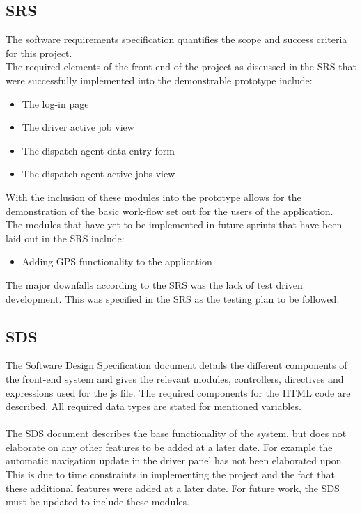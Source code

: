 \documentclass[12pt]{article}
\begin{document}
\subsection{SRS}
The software requirements specification quantifies the scope and success criteria for this project. \\ 

The required elements of the front-end of the project as discussed in the SRS that were successfully implemented into the demonstrable prototype include:
\begin{itemize}
\item The log-in page
\item The driver active job view
\item The dispatch agent data entry form
\item The dispatch agent active jobs view
\end{itemize}
With the inclusion of these modules into the prototype allows for the demonstration of the basic work-flow set out for the users of the application.\\

The modules that have yet to be implemented in future sprints that have been laid out in the SRS include:
\begin{itemize}
\item Adding GPS functionality to the application
\end{itemize}

The major downfalls according to the SRS was the lack of test driven development. This was specified in the SRS as the testing plan to be followed.
\subsection{SDS}
The Software Design Specification document details the different components  of the front-end system and gives the relevant modules, controllers, directives and expressions used for the js file. The required components for the HTML code are described. All required data types are stated for mentioned variables. \\\\
The SDS document describes the base functionality of the system, but does not elaborate on any other features to be added at a later date. For example the automatic navigation update in the driver panel has not been elaborated upon. This is due to time constraints in implementing the project and the fact that these additional features were added at a later date. For future work, the SDS must be updated to include these modules.
\end{document}
